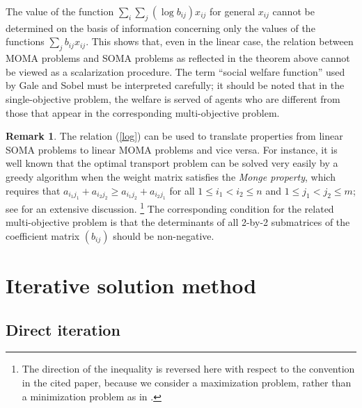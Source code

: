 \documentclass{article}
\theoremstyle{definition}
\newtheorem{remark}[theorem]{Remark}
\renewcommand{\baselinestretch}{1.5}
\let\origfootnote\footnote
\renewcommand{\footnote}[1]{%
   \begingroup
   \renewcommand{\baselinestretch}{1}%
   \origfootnote{#1}%
   \endgroup}
\begin{document}
The value of the function $\sum_i \sum_j (\log b_{ij}) x_{ij}$ for general $x_{ij}$ cannot be determined on the basis of information concerning only the values of the functions $\sum_j b_{ij}x_{ij}$. This shows that, even in the linear case, the relation between MOMA problems and SOMA problems as reflected in the theorem above cannot be viewed as a scalarization procedure. The term ``social welfare function'' used by
Gale and Sobel \cite{Gale79} must be interpreted carefully; it should be noted that in the single-objective problem, the welfare is served of agents who are different from those that appear in the corresponding multi-objective problem.

\begin{remark}
The relation (\ref{log}) can be used to translate properties from linear SOMA problems to linear MOMA problems and vice versa. For instance, it is well known that the optimal transport problem can be solved very easily by a greedy algorithm when the weight matrix satisfies the \emph{Monge property}, which requires that $a_{i_1 j_1} + a_{i_2 j_2} \geq a_{i_1 j_2} + a_{i_2 j_1}$ for all $1 \leq i_1 < i_2 \leq n$ and $1 \leq j_1 < j_2 \leq m$; see \cite{Burkard} for an extensive discussion.\footnote{The direction of the inequality is reversed here with respect to the convention in the cited paper, because we consider a maximization problem, rather than a minimization problem as in \cite{Burkard}.} The corresponding condition for the related multi-objective problem is that the determinants of all 2-by-2 submatrices of the coefficient matrix $(b_{ij})$ should be non-negative.
\end{remark}

\section{Iterative solution method} \label{iterative}

\subsection{Direct iteration}
\end{document}
